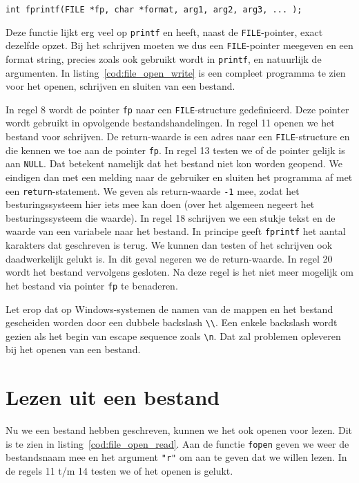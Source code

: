 \hspace*{1em}\texttt{int fprintf(FILE *fp, char *format, arg1, arg2, arg3, ... );}

Deze functie lijkt erg veel op  \texttt{printf} en heeft, naast de \texttt{FILE}-pointer, exact dezelfde opzet. Bij het schrijven moeten we dus een \texttt{FILE}-pointer meegeven en een format string, precies zoals ook gebruikt wordt in \texttt{printf}, en natuurlijk de argumenten. In listing~\ref{cod:file_open_write} is een compleet programma te zien voor het openen, schrijven en sluiten van een bestand.


In regel 8 wordt de pointer \texttt{fp} naar een \texttt{FILE}-structure gedefinieerd. Deze pointer wordt gebruikt in opvolgende bestandshandelingen. In regel 11 openen we het bestand voor schrijven. De return-waarde is een adres naar een \texttt{FILE}-structure en die kennen we toe aan de pointer \texttt{fp}. In regel 13 testen we of de pointer gelijk is aan \texttt{NULL}. Dat betekent namelijk dat het bestand niet kon worden geopend. We eindigen dan met een melding naar de gebruiker en sluiten het programma af met een \texttt{return}-statement. We geven als return-waarde \texttt{-1} mee, zodat het besturingssysteem hier iets mee kan doen (over het algemeen negeert het besturingssysteem die waarde). In regel 18 schrijven we een stukje tekst en de waarde van een variabele naar het bestand. In principe geeft \texttt{fprintf} het aantal karakters dat geschreven is terug. We kunnen dan testen of het schrijven ook daadwerkelijk gelukt is. In dit geval negeren we de return-waarde. In regel 20 wordt het bestand vervolgens gesloten. Na deze regel is het niet meer mogelijk om het bestand via pointer \texttt{fp} te benaderen.

Let erop dat op Windows-systemen de namen van de mappen en het bestand gescheiden worden door een dubbele backslash \texttt{\textbackslash\textbackslash}. Een enkele backslash wordt gezien als het begin van escape sequence zoals \texttt{\textbackslash n}. Dat zal problemen opleveren bij het openen van een bestand.


\section{Lezen uit een bestand}
Nu we een bestand hebben geschreven, kunnen we het ook openen voor lezen. Dit is te zien in listing~\ref{cod:file_open_read}. Aan de functie \texttt{fopen} geven we weer de bestandsnaam mee en het argument \texttt{"{}r"} om aan te geven dat we willen lezen. In de regels 11 t/m 14 testen we of het openen is gelukt.

